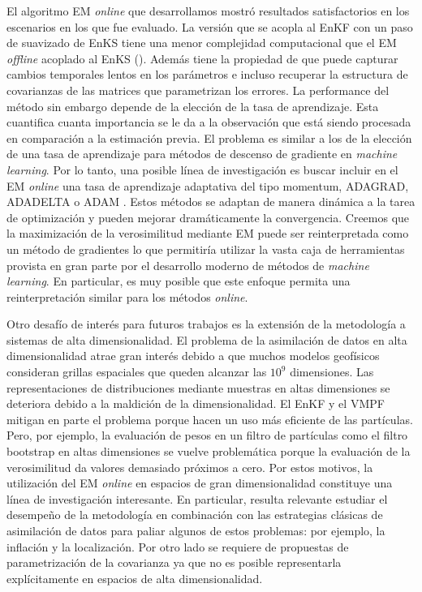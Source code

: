 El algoritmo EM \textit{online} que desarrollamos mostró resultados satisfactorios en los escenarios en los que fue evaluado. La versión que se acopla al EnKF con un paso de suavizado de EnKS tiene una menor complejidad computacional que el EM \textit{offline} acoplado al EnKS (\cite{Pulido2018}). Además tiene la propiedad de que puede capturar cambios temporales lentos en los parámetros e incluso recuperar la estructura de covarianzas de las matrices que parametrizan los errores. La performance del método sin embargo depende de la elección de la tasa de aprendizaje. Esta cuantifica cuanta importancia se le da a la observación que está siendo procesada en comparación a la estimación previa. El problema es similar a los de la elección de una tasa de aprendizaje para métodos de descenso de gradiente en \textit{machine learning}. Por lo tanto, una posible línea de investigación es buscar incluir en el EM \textit{online} una tasa de aprendizaje adaptativa del tipo momentum, ADAGRAD, ADADELTA o ADAM \citep{Zeiler2012, Kingma2014}. Estos métodos se adaptan de manera dinámica a la tarea de optimización y pueden mejorar dramáticamente la convergencia. Creemos que la maximización de la verosimilitud mediante EM puede ser reinterpretada como un método de gradientes lo que permitiría utilizar la vasta caja de herramientas provista en gran parte por el desarrollo moderno de métodos de \textit{machine learning}. En particular, es muy posible que este enfoque permita una reinterpretación similar para los métodos \textit{online}.

Otro desafío de interés para futuros trabajos es la extensión de la metodología a sistemas de alta dimensionalidad. El problema de la asimilación de datos en alta dimensionalidad atrae gran interés debido a que muchos modelos geofísicos consideran grillas espaciales que queden alcanzar las $10^9$ dimensiones. Las representaciones de distribuciones mediante muestras en altas dimensiones se deteriora debido a la maldición de la dimensionalidad. El EnKF y el VMPF mitigan en parte el problema porque hacen un uso más eficiente de las partículas. Pero, por ejemplo, la evaluación de pesos en un filtro de partículas como el filtro bootstrap en altas dimensiones se vuelve problemática porque la evaluación de la verosimilitud da valores demasiado próximos a cero. Por estos motivos, la utilización del EM \textit{online} en espacios de gran dimensionalidad constituye una línea de investigación interesante. En particular, resulta relevante estudiar el desempeño de la metodología en combinación con las estrategias clásicas de asimilación de datos para paliar algunos de estos problemas: por ejemplo, la inflación y la localización. Por otro lado se requiere de propuestas de parametrización de la covarianza ya que no es posible representarla explícitamente en espacios de alta dimensionalidad.

